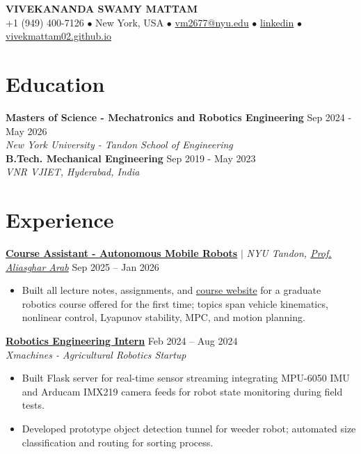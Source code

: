 \documentclass[10pt,letterpaper]{article}
\begin{document}
\begin{center}
    {\Large \textbf{VIVEKANANDA SWAMY MATTAM}} \\
    \vspace{4pt}
    \small
    +1 (949) 400-7126 $\bullet$ New York, USA $\bullet$ \href{mailto:vm2677@nyu.edu}{vm2677@nyu.edu} $\bullet$ \href{https://linkedin.com/in/vivek-mattam-a8590b23a}{linkedin} $\bullet$ \href{https://vivekmattam02.github.io}{vivekmattam02.github.io}
\end{center}
\vspace{-4pt}

\section{Education}

\textbf{Masters of Science - Mechatronics and Robotics Engineering} \hfill Sep 2024 - May 2026 \\
\textit{New York University - Tandon School of Engineering} \\[2pt]
\textbf{B.Tech. Mechanical Engineering} \hfill Sep 2019 - May 2023 \\
\textit{VNR VJIET, Hyderabad, India}
\vspace{-2pt}

\section{Experience}

\href{https://wp.nyu.edu/aarab/}{\textbf{Course Assistant - Autonomous Mobile Robots}} $|$ \textit{NYU Tandon, \href{https://wp.nyu.edu/aarab/}{Prof. Aliasghar Arab}} \hfill Sep 2025 -- Jan 2026
\begin{itemize}
    \item Built all lecture notes, assignments, and \href{https://vivekmattam02.github.io/amr-notes/}{course website} for a graduate robotics course offered for the first time; topics span vehicle kinematics, nonlinear control, Lyapunov stability, MPC, and motion planning.
\end{itemize}
\vspace{1pt}

\href{https://www.xmachines.ai/}{\textbf{Robotics Engineering Intern}} \hfill Feb 2024 -- Aug 2024 \\
\textit{Xmachines - Agricultural Robotics Startup}
\begin{itemize}
    \item Built Flask server for real-time sensor streaming integrating MPU-6050 IMU and Arducam IMX219 camera feeds for robot state monitoring during field tests.
    \item Developed prototype object detection tunnel for weeder robot; automated size classification and routing for sorting process.
\end{itemize}
\vspace{1pt}
\end{document}
